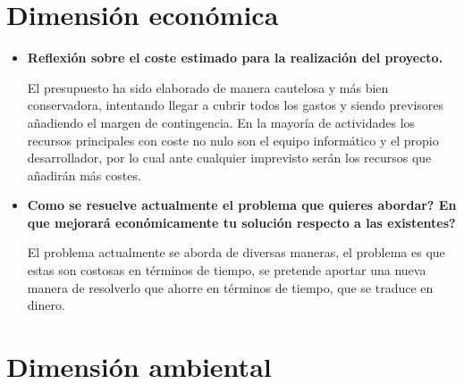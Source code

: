 \section{Dimensión económica}

\begin{itemize}
 \item \textbf{Reflexión sobre el coste estimado para la realización del proyecto.}\newline
 
    El presupuesto ha sido elaborado de manera cautelosa y más bien conservadora, intentando llegar a cubrir todos los gastos y siendo previsores añadiendo el margen de contingencia. En la mayoría de actividades los recursos principales con coste no nulo son el equipo informático y el propio desarrollador, por lo cual ante cualquier imprevisto serán los recursos que añadirán más costes.

 \item \textbf{Como se resuelve actualmente el problema que quieres abordar? En que mejorará económicamente tu solución respecto a las existentes?}\newline
 
 El problema actualmente se aborda de diversas maneras, el problema es que estas son costosas en términos de tiempo, se pretende aportar una nueva manera de resolverlo que ahorre en términos de tiempo, que se traduce en dinero.
\end{itemize}

\section{Dimensión ambiental}

